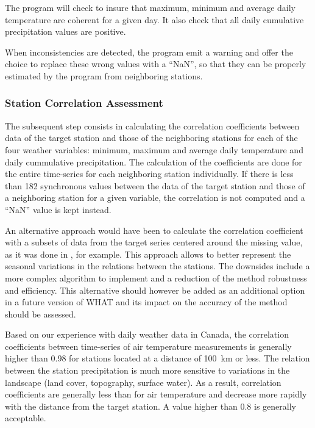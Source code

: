 \documentclass[WHATMANUAL.tex]{subfiles}
\begin{document}
The program will check to insure that maximum, minimum and average daily temperature are coherent for a given day. It also check that all daily cumulative precipitation values are positive.

When inconsistencies are detected, the program emit a warning and offer the choice to replace these wrong values with a ``NaN'', so that they can be properly estimated by the program from neighboring stations.

\subsubsection{Station Correlation Assessment}

The subsequent step consists in calculating the correlation coefficients between data of the target station and those of the neighboring stations for each of the four weather variables: minimum, maximum and average daily temperature and daily cummulative precipitation. The calculation of the coefficients are done for the entire time-series for each neighboring station individually. If there is less than 182 synchronous values between the data of the target station and those of a neighboring station for a given variable, the correlation is not computed and a ``NaN'' value is kept instead.

An alternative approach would have been to calculate the correlation coefficient with a subsets of data from the target series centered around the missing value, as it was done in \cite{simolo_improving_2010}, for example. This approach allows to better represent the seasonal variations in the relations between the stations. The downsides include a more complex algorithm to implement and a reduction of the method robustness and efficiency. This alternative should however be added as an additional option in a future version of WHAT and its impact on the accuracy of the method should be assessed.

Based on our experience with daily weather data in Canada, the correlation coefficients between time-series of air temperature measurements is generally higher than 0.98 for stations located at a distance of 100~km or less. The relation between the station precipitation is much more sensitive to variations in the landscape (land cover, topography, surface water). As a result, correlation coefficients are generally less than for air temperature and decrease more rapidly with the distance from the target station. A value higher than 0.8 is generally acceptable.
\end{document}
